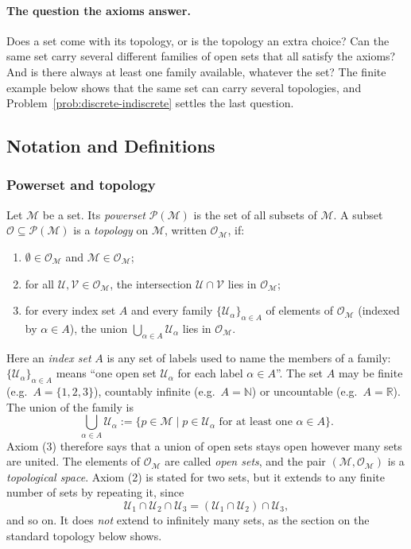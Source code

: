 \documentclass[11pt]{article}
\begin{document}
\paragraph{The question the axioms answer.}
Does a set come with its topology, or is the topology an extra choice? Can the same set carry several different families of open sets that all satisfy the axioms? And is there always at least one family available, whatever the set? The finite example below shows that the same set can carry several topologies, and Problem~\ref{prob:discrete-indiscrete} settles the last question.

\subsection*{Notation and Definitions}

\subsubsection*{Powerset and topology}
Let $\mathcal M$ be a set. Its \emph{powerset} $\mathcal P(\mathcal M)$ is the set of all subsets of $\mathcal M$. A subset $\mathcal O\subseteq\mathcal P(\mathcal M)$ is a \emph{topology} on $\mathcal M$, written $\mathcal O_{\mathcal M}$, if:
\begin{enumerate}[label=(\arabic*)]
  \item $\emptyset\in\mathcal O_{\mathcal M}$ and $\mathcal M\in\mathcal O_{\mathcal M}$;
  \item for all $\mathcal U,\mathcal V\in\mathcal O_{\mathcal M}$, the intersection $\mathcal U\cap\mathcal V$ lies in $\mathcal O_{\mathcal M}$;
  \item for every index set $A$ and every family $\{\mathcal U_\alpha\}_{\alpha\in A}$ of elements of $\mathcal O_{\mathcal M}$ (indexed by $\alpha\in A$), the union $\bigcup_{\alpha\in A}\mathcal U_\alpha$ lies in $\mathcal O_{\mathcal M}$.
\end{enumerate}
Here an \emph{index set} $A$ is any set of labels used to name the members of a family: $\{\mathcal U_\alpha\}_{\alpha\in A}$ means ``one open set $\mathcal U_\alpha$ for each label $\alpha\in A$''. The set $A$ may be finite (e.g.\ $A=\{1,2,3\}$), countably infinite (e.g.\ $A=\mathbb N$) or uncountable (e.g.\ $A=\mathbb R$). The union of the family is
\[
\bigcup_{\alpha\in A}\mathcal U_\alpha:=\{p\in\mathcal M\mid p\in\mathcal U_\alpha\text{ for at least one }\alpha\in A\}.
\]
Axiom (3) therefore says that a union of open sets stays open however many sets are united.
The elements of $\mathcal O_{\mathcal M}$ are called \emph{open sets}, and the pair $(\mathcal M,\mathcal O_{\mathcal M})$ is a \emph{topological space}. Axiom (2) is stated for two sets, but it extends to any finite number of sets by repeating it, since
\[
\mathcal U_1\cap\mathcal U_2\cap\mathcal U_3=(\mathcal U_1\cap\mathcal U_2)\cap\mathcal U_3,
\]
and so on. It does \emph{not} extend to infinitely many sets, as the section on the standard topology below shows.
\end{document}
